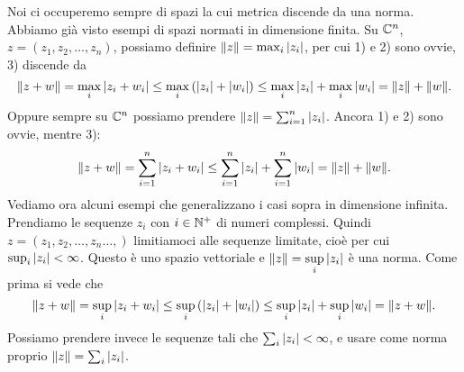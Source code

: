 Noi ci occuperemo sempre di spazi la cui metrica discende da una norma.
Abbiamo già visto esempi di spazi normati in dimensione finita. Su $\mathbb C^n$,
$z = \left( z_1, z_2, \ldots, z_n \right)$, possiamo definire
$\|z\| = \max_i {\left|z_i\right|}$, per cui 1) e 2) sono ovvie, 3) discende da \[
\|z + w\| = \max_i {\left|z_i + w_i\right|} \leq \max_i \left({\left|z_i\right|} + {\left|w_i\right|}\right)
\leq \max_i {\left|z_i\right|} + \max_i {\left|w_i\right|} = \|z\| + \|w\|
.\] 
Oppure sempre su $\mathbb C^n$ possiamo prendere $\|z\| = \sum_{i=1}^{n} {\left|z_i\right|}$.
Ancora 1) e 2) sono ovvie, mentre 3):
\[
	\|z + w\| = \sum_{i=1}^{n} {\left|z_i + w_i\right|} \leq \sum_{i=1}^{n} {\left|z_i\right|} +
	\sum_{i=1}^{n} {\left|w_i\right|} = \|z\| + \|w\|
.\] 
Vediamo ora alcuni esempi che generalizzano i casi sopra in dimensione
infinita. Prendiamo le sequenze $z_i$ con $i \in \mathbb N^+$ di numeri complessi.
Quindi $z = \left( z_1, z_2, \ldots, z_n \ldots,  \right)$ limitiamoci alle
sequenze limitate, cioè per cui $\sup_i {\left|z_i\right|} < \infty$. Questo è uno
spazio vettoriale e $\|z\| = \displaystyle \sup_i {\left|z_i\right|}$ è una norma.
Come prima si vede che
\[
	\|z + w \| = \sup_i {\left|z_i + w_i\right|} \leq \sup_i \left({\left|z_i\right|} + {\left|w_i\right|}
	\right) \leq \sup_i {\left|z_i\right|} + \sup_i {\left|w_i\right|} = \| z + w\| 
.\] 
Possiamo prendere invece le sequenze tali che 
$\sum_i {\left|z_i\right|} < \infty$, e usare come norma proprio 
$\|z\| = \sum_{i} {\left|z_i\right|}$. 

